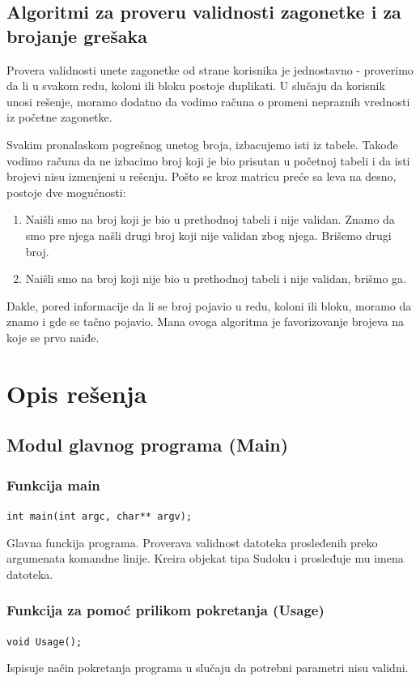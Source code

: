 \documentclass[a4paper]{article}
\begin{document}
    \subsection{Algoritmi za proveru validnosti zagonetke i za brojanje grešaka}
    Provera validnosti unete zagonetke od strane korisnika je jednostavno - proverimo da li u svakom redu, koloni ili bloku postoje duplikati. 
    U slučaju da korisnik unosi rešenje, moramo dodatno da vodimo računa o promeni nepraznih vrednosti iz početne zagonetke.
    \par Svakim pronalaskom pogrešnog unetog broja, izbacujemo isti iz tabele. Tako\-đe vodimo računa da ne izbacimo broj koji je bio prisutan u početnoj tabeli i da isti brojevi nisu izmenjeni u rešenju.
    Pošto se kroz matricu preće sa leva na desno, postoje dve mogućnosti:
    \begin{enumerate}
        \item Naišli smo na broj koji je bio u prethodnoj tabeli i nije validan. Znamo da smo pre njega našli drugi broj koji nije validan zbog njega. Brišemo drugi broj.
        \item Naišli smo na broj koji nije bio u prethodnoj tabeli i nije validan, brišmo ga.
    \end{enumerate}
    Dakle, pored informacije da li se broj pojavio u redu, koloni ili bloku, moramo da znamo i gde se tačno pojavio. Mana ovoga algoritma je favorizovanje brojeva na koje
    se prvo naiđe.
    \newpage
    \section{Opis rešenja}
    
    \subsection{Modul glavnog programa (Main)}
    \subsubsection{Funkcija main}
    \texttt{int main(int argc, char** argv);}
    \par Glavna funckija programa. Proverava validnost datoteka prosleđenih preko argumenata komandne linije. 
    Kreira objekat tipa Sudoku i prosleđuje mu imena datoteka.
    \subsubsection{Funkcija za pomoć prilikom pokretanja (Usage)}
    \texttt{void Usage();}
    \par Ispisuje način pokretanja programa u slučaju da potrebni parametri nisu validni.
\end{document}
